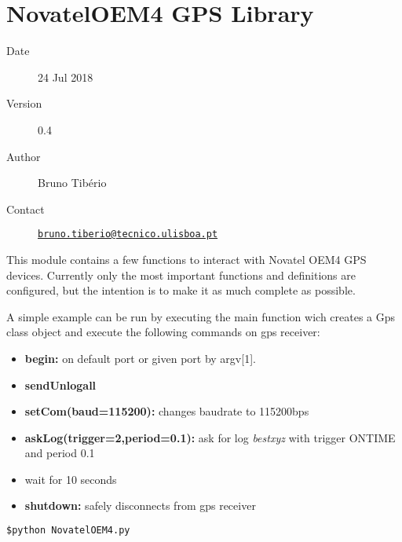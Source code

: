 
\chapter{NovatelOEM4 GPS Library}\label{welcome-to-novateloem4-gps-librarys-documentation}

\begin{description}
\item[Date]
24 Jul 2018
\item[Version]
0.4
\item[Author]
Bruno Tibério
\item[Contact]
\href{mailto:bruno.tiberio@tecnico.ulisboa.pt}{\nolinkurl{bruno.tiberio@tecnico.ulisboa.pt}}
\end{description}

This module contains a few functions to interact with Novatel OEM4 GPS
devices. Currently only the most important functions and definitions are
configured, but the intention is to make it as much complete as
possible.

A simple example can be run by executing the main function wich creates
a Gps class object and execute the following commands on gps receiver:

\begin{itemize}
\tightlist
\item
  \textbf{begin:} on default port or given port by argv{[}1{]}.
\item
  \textbf{sendUnlogall}
\item
  \textbf{setCom(baud=115200):} changes baudrate to 115200bps
\item
  \textbf{askLog(trigger=2,period=0.1):} ask for log \emph{bestxyz} with
  trigger {ONTIME} and period {0.1}
\item
  wait for 10 seconds
\item
  \textbf{shutdown:} safely disconnects from gps receiver
\end{itemize}

\begin{lstlisting}[language=python,frame=none,backgroundcolor=\color{gray!15},numbers=none]
$python NovatelOEM4.py
\end{lstlisting}


